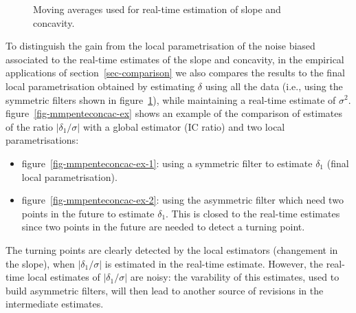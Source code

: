 \documentclass[
]{article}
\newcommand\1{\mathds{1}}
\begin{document}
\begin{figure}[H]

\caption{\label{fig-mmpenteconcac}Moving averages used for real-time
estimation of slope and concavity.}


\end{figure}%

To distinguish the gain from the local parametrisation of the noise
biased associated to the real-time estimates of the slope and concavity,
in the empirical applications of section~\ref{sec-comparison} we also
compares the results to the final local parametrisation obtained by
estimating \(\delta\) using all the data (i.e., using the symmetric
filters shown in figure~\ref{fig-mmpenteconcac}), while maintaining a
real-time estimate of \(\sigma^2\). figure~\ref{fig-mmpenteconcac-ex}
shows an example of the comparison of estimates of the ratio
\(|\delta_1/\sigma|\) with a global estimator (IC ratio) and two local
parametrisations:

\begin{itemize}
\item
  figure~\ref{fig-mmpenteconcac-ex-1}: using a symmetric filter to
  estimate \(\delta_1\) (final local parametrisation).
\item
  figure~\ref{fig-mmpenteconcac-ex-2}: using the asymmetric filter which
  need two points in the future to estimate \(\delta_1\). This is closed
  to the real-time estimates since two points in the future are needed
  to detect a turning point.
\end{itemize}

The turning points are clearly detected by the local estimators
(changement in the slope), when \(|\delta_1/\sigma|\) is estimated in
the real-time estimate. However, the real-time local estimates of
\(|\delta_1/\sigma|\) are noisy: the varability of this estimates, used
to build asymmetric filters, will then lead to another source of
revisions in the intermediate estimates.
\end{document}
